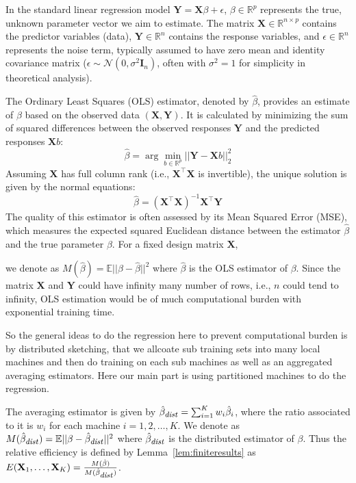 \documentclass[11pt]{article}
\numberwithin{equation}{section}
\theoremstyle{plain}
\theoremstyle{definition}
\theoremstyle{remark}
\begin{document}
In the standard linear regression model $\mathbf{Y} = \mathbf{X}\beta + \epsilon$, $\beta \in \mathbb{R}^p$ represents the true, unknown parameter vector we aim to estimate. The matrix $\mathbf{X} \in \mathbb{R}^{n \times p}$ contains the predictor variables (data), $\mathbf{Y} \in \mathbb{R}^n$ contains the response variables, and $\epsilon \in \mathbb{R}^n$ represents the noise term, typically assumed to have zero mean and identity covariance matrix ($\epsilon \sim \mathcal{N}(0, \sigma^2 \mathbf{I}_n)$, often with $\sigma^2=1$ for simplicity in theoretical analysis).

The Ordinary Least Squares (OLS) estimator, denoted by $\hat{\beta}$, provides an estimate of $\beta$ based on the observed data $(\mathbf{X}, \mathbf{Y})$. It is calculated by minimizing the sum of squared differences between the observed responses $\mathbf{Y}$ and the predicted responses $\mathbf{X}b$:
\[
\hat{\beta} = \arg\min_{b \in \mathbb{R}^p} ||\mathbf{Y} - \mathbf{X}b||_2^2
\]
Assuming $\mathbf{X}$ has full column rank (i.e., $\mathbf{X}^{\top}\mathbf{X}$ is invertible), the unique solution is given by the normal equations:
\[
\hat{\beta} = (\mathbf{X}^{\top}\mathbf{X})^{-1}\mathbf{X}^{\top}\mathbf{Y}
\]
The quality of this estimator is often assessed by its Mean Squared Error (MSE), which measures the expected squared Euclidean distance between the estimator $\hat{\beta}$ and the true parameter $\beta$. For a fixed design matrix $\mathbf{X}$,

we denote as $M(\hat{\beta}) = \mathbb{E}||\beta - \hat{\beta}||^2$
where $\hat{\beta}$ is the OLS estimator of $\beta$.
Since the matrix $\mathbf{X}$ and $\mathbf{Y}$ could have infinity many number of rows, i.e., $n$ could tend to infinity, OLS estimation would be of much computational burden with exponential training time.

So the general ideas to do the regression here to prevent computational burden is by distributed sketching, that we allcoate sub training sets into many local machines and then do training on each sub machines as well as an aggregated averaging estimators. Here our main part is using partitioned machines to do the regression.

The averaging estimator is given by $\hat{\beta}_{\text{\footnotesize \textit{dist}}} = \sum_{i=1}^K w_i \hat{\beta}_i$, where the ratio associated to it is $w_i$ for each machine $i = 1,2,\ldots,K$.
We denote as $M(\hat{\beta}_{\text{\footnotesize \textit{dist}}}) = \mathbb{E}||\beta - \hat{\beta}_{\text{\footnotesize \textit{dist}}}||^2$
where $\hat{\beta}_{\text{\footnotesize \textit{dist}}}$ is the distributed estimator of $\beta$.
Thus the relative efficiency is defined by Lemma~\ref{lem:finiteresults} as $E(\mathbf{X}_1,\dots,\mathbf{X}_K) = \frac{M(\hat{\beta})}{M(\hat{\beta}_{\text{\footnotesize \textit{dist}}})}$.
\end{document}
